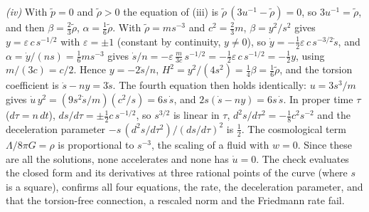 \emph{(iv)} With $\tilde p = 0$ and $\tilde\rho > 0$ the equation of (iii) is $\tilde\rho\,(3u^{-1} - \tilde\rho) = 0$, so $3u^{-1} = \tilde\rho$, and then $\beta = \tfrac23\tilde\rho$, $\alpha = \tfrac16\tilde\rho$. With $\tilde\rho = m s^{-3}$ and $c^{2} = \tfrac23 m$, $\beta = y^{2}/s^{2}$ gives $y = \varepsilon\,c\,s^{-1/2}$ with $\varepsilon = \pm1$ (constant by continuity, $y \neq 0$), so $\dot y = -\tfrac12\varepsilon\,c\,s^{-3/2}\dot s$, and $\alpha = \dot y/(ns) = \tfrac16 m s^{-3}$ gives $\dot s/n = -\varepsilon\,\tfrac{m}{3c}\,s^{-1/2} = -\tfrac12\varepsilon\,c\,s^{-1/2} = -\tfrac12 y$, using $m/(3c) = c/2$. Hence $y = -2\dot s/n$, $H^{2} = y^{2}/(4s^{2}) = \tfrac14\beta = \tfrac16\tilde\rho$, and the torsion coefficient is $\dot s - n y = 3\dot s$. The fourth equation then holds identically: $u = 3s^{3}/m$ gives $\dot u\,y^{2} = (9 s^{2}\dot s/m)(c^{2}/s) = 6 s\,\dot s$, and $2s(\dot s - n y) = 6 s\,\dot s$. In proper time $\tau$ ($d\tau = n\,dt$), $ds/d\tau = \pm\tfrac12 c\,s^{-1/2}$, so $s^{3/2}$ is linear in $\tau$, $d^{2}s/d\tau^{2} = -\tfrac18 c^{2}s^{-2}$ and the deceleration parameter $-s\,(d^{2}s/d\tau^{2})/(ds/d\tau)^{2}$ is $\tfrac12$. The cosmological term $\Lambda/8\pi G = \rho$ is proportional to $s^{-3}$, the scaling of a fluid with $w = 0$. Since these are all the solutions, none accelerates and none has $\dot u = 0$. The check evaluates the closed form and its derivatives at three rational points of the curve (where $s$ is a square), confirms all four equations, the rate, the deceleration parameter, and that the torsion-free connection, a rescaled norm and the Friedmann rate fail.

